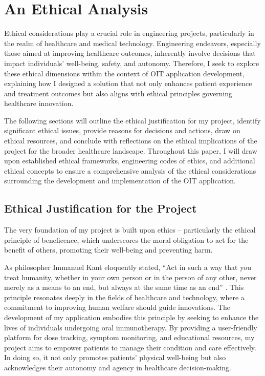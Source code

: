 \chapter{An Ethical Analysis}
\label{section:ethics}

Ethical considerations play a crucial role in engineering projects, particularly in the realm of healthcare and medical technology. Engineering endeavors, especially those aimed at improving healthcare outcomes, inherently involve decisions that impact individuals' well-being, safety, and autonomy. Therefore, I seek to explore these ethical dimensions within the context of OIT application development, explaining how I designed a solution that not only enhances patient experience and treatment outcomes but also aligns with ethical principles governing healthcare innovation.

The following sections will outline the ethical justification for my project, identify significant ethical issues, provide reasons for decisions and actions, draw on ethical resources, and conclude with reflections on the ethical implications of the project for the broader healthcare landscape. Throughout this paper, I will draw upon established ethical frameworks, engineering codes of ethics, and additional ethical concepts to ensure a comprehensive analysis of the ethical considerations surrounding the development and implementation of the OIT application.

\section{Ethical Justification for the Project}

The very foundation of my project is built upon ethics – particularly the ethical principle of beneficence, which underscores the moral obligation to act for the benefit of others, promoting their well-being and preventing harm. 

As philosopher Immanuel Kant eloquently stated, ``Act in such a way that you treat humanity, whether in your own person or in the person of any other, never merely as a means to an end, but always at the same time as an end'' \cite{Kant}. This principle resonates deeply in the fields of healthcare and technology, where a commitment to improving human welfare should guide innovations. The development of my application embodies this principle by seeking to enhance the lives of individuals undergoing oral immunotherapy. By providing a user-friendly platform for dose tracking, symptom monitoring, and educational resources, my project aims to empower patients to manage their condition and care effectively. In doing so, it not only promotes patients' physical well-being but also acknowledges their autonomy and agency in healthcare decision-making. 

